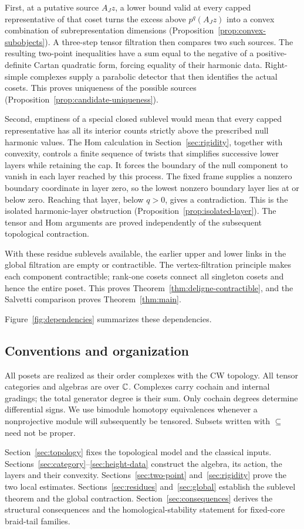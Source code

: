 First, at a putative source \(A_Jz\), a lower bound valid at every
capped representative of that coset turns the excess above
\(p^q(A_Jz)\) into a convex combination of subrepresentation dimensions
(Proposition~\ref{prop:convex-subobjects}).
A three-step tensor filtration then compares two such sources.
The resulting two-point inequalities have a sum equal to the
negative of a positive-definite Cartan quadratic form, forcing
equality of their harmonic data.  Right-simple complexes supply
a parabolic detector that then identifies the actual cosets.
This proves uniqueness of the possible sources
(Proposition~\ref{prop:candidate-uniqueness}).

Second, emptiness of a special closed sublevel would mean that
every capped representative has all its interior counts strictly
above the prescribed null harmonic values.  The Hom calculation
in Section~\ref{sec:rigidity}, together with convexity, controls
a finite sequence of twists that simplifies successive lower
layers while retaining the cap.  It forces the boundary of the
null component to vanish in each layer reached by this process.
The fixed frame supplies a nonzero boundary coordinate in layer
zero, so the lowest nonzero boundary layer lies at or below zero.
Reaching that layer, below \(q>0\), gives a contradiction.  This is
the isolated harmonic-layer obstruction
(Proposition~\ref{prop:isolated-layer}).
The tensor and Hom arguments are proved independently of the
subsequent topological contraction.

With these residue sublevels available, the earlier upper and lower
links in the global filtration are empty or contractible.
The vertex-filtration principle makes each component contractible;
rank-one cosets connect all singleton cosets and hence the entire
poset.  This proves Theorem~\ref{thm:deligne-contractible}, and
the Salvetti comparison proves Theorem~\ref{thm:main}.

Figure~\ref{fig:dependencies} summarizes these dependencies.



\subsection{Conventions and organization}

All posets are realized as their order complexes with the CW
topology.  All tensor categories and algebras are over \(\mathbb C\).
Complexes carry cochain and internal gradings; the total generator
degree is their sum.  Only cochain degrees determine differential
signs.  We use bimodule homotopy equivalences whenever a
nonprojective module will subsequently be tensored.
Subsets written with \(\subseteq\) need not be proper.

Section~\ref{sec:topology} fixes the topological model and the
classical inputs.
Sections~\ref{sec:category}--\ref{sec:height-data} construct the
algebra, its action, the layers and their convexity.
Sections~\ref{sec:two-point} and~\ref{sec:rigidity} prove the two
local estimates.
Sections~\ref{sec:residues} and~\ref{sec:global} establish the
sublevel theorem and the global contraction.
Section~\ref{sec:consequences} derives the structural consequences and
the homological-stability statement for fixed-core braid-tail families.
